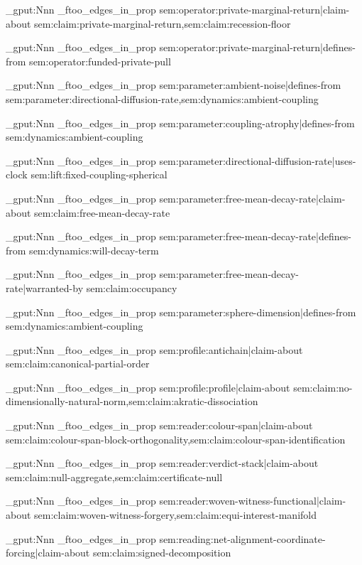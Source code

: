 \prop_gput:Nnn \g_ftoo_edges_in_prop { sem:operator:private-marginal-return|claim-about } { sem:claim:private-marginal-return,sem:claim:recession-floor }

\prop_gput:Nnn \g_ftoo_edges_in_prop { sem:operator:private-marginal-return|defines-from } { sem:operator:funded-private-pull }

\prop_gput:Nnn \g_ftoo_edges_in_prop { sem:parameter:ambient-noise|defines-from } { sem:parameter:directional-diffusion-rate,sem:dynamics:ambient-coupling }

\prop_gput:Nnn \g_ftoo_edges_in_prop { sem:parameter:coupling-atrophy|defines-from } { sem:dynamics:ambient-coupling }

\prop_gput:Nnn \g_ftoo_edges_in_prop { sem:parameter:directional-diffusion-rate|uses-clock } { sem:lift:fixed-coupling-spherical }

\prop_gput:Nnn \g_ftoo_edges_in_prop { sem:parameter:free-mean-decay-rate|claim-about } { sem:claim:free-mean-decay-rate }

\prop_gput:Nnn \g_ftoo_edges_in_prop { sem:parameter:free-mean-decay-rate|defines-from } { sem:dynamics:will-decay-term }

\prop_gput:Nnn \g_ftoo_edges_in_prop { sem:parameter:free-mean-decay-rate|warranted-by } { sem:claim:occupancy }

\prop_gput:Nnn \g_ftoo_edges_in_prop { sem:parameter:sphere-dimension|defines-from } { sem:dynamics:ambient-coupling }

\prop_gput:Nnn \g_ftoo_edges_in_prop { sem:profile:antichain|claim-about } { sem:claim:canonical-partial-order }

\prop_gput:Nnn \g_ftoo_edges_in_prop { sem:profile:profile|claim-about } { sem:claim:no-dimensionally-natural-norm,sem:claim:akratic-dissociation }

\prop_gput:Nnn \g_ftoo_edges_in_prop { sem:reader:colour-span|claim-about } { sem:claim:colour-span-block-orthogonality,sem:claim:colour-span-identification }

\prop_gput:Nnn \g_ftoo_edges_in_prop { sem:reader:verdict-stack|claim-about } { sem:claim:null-aggregate,sem:claim:certificate-null }

\prop_gput:Nnn \g_ftoo_edges_in_prop { sem:reader:woven-witness-functional|claim-about } { sem:claim:woven-witness-forgery,sem:claim:equi-interest-manifold }

\prop_gput:Nnn \g_ftoo_edges_in_prop { sem:reading:net-alignment-coordinate-forcing|claim-about } { sem:claim:signed-decomposition }

